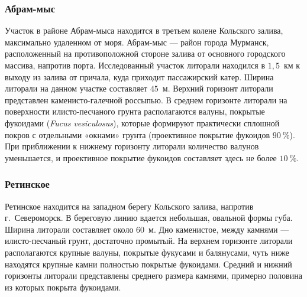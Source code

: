             \subsubsection{Абрам-мыс}
Участок  в районе  Абрам-мыса  находится в третьем колене Кольского залива, максимально удаленном от моря.
Абрам-мыс --- район   города   Мурманск,  расположенный   на противоположной стороне залива от основного городского массива, напротив порта. 
Исследованный участок   литорали   находился   в   $1,5$~км   к   выходу   из   залива   от   причала,   куда   приходит пассажирский катер. 
Ширина   литорали   на   данном   участке   составляет   $45$~м.   
Верхний   горизонт   литорали представлен  каменисто-галечной  россыпью. 
В среднем  горизонте литорали на поверхности илисто-песчаного   грунта   располагаются   валуны,   покрытые   фукоидами   ({\it Fucus  vesiculosus}), которые   формируют   практически   сплошной   покров   с   отдельными   «окнами»   грунта (проективное  покрытие фукоидов $90~\%$).  
При приближении  к нижнему горизонту литорали количество   валунов   уменьшается,   и   проективное   покрытие   фукоидов   составляет   здесь   не более $10~\%$.

\subsubsection{Ретинское}
Ретинское находится на западном берегу Кольского залива, напротив г.~Североморск. 
В береговую линию вдается небольшая, овальной формы губа. 
Ширина литорали составляет около $60$~м. 
Дно каменистое, между камнями --- илисто-песчаный грунт, достаточно промытый. 
На верхнем горизонте литорали располагаются крупные валуны, покрытые фукусами и балянусами, чуть ниже находятся крупные камни полностью покрытые фукоидами.
Средний и нижний горизонты литорали представлены среднего размера камнями, примерно половина из которых покрыта фукоидами. 

